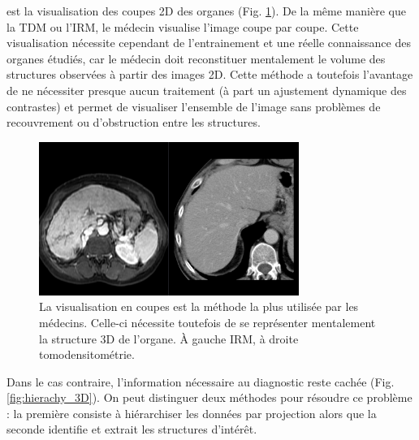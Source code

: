      est la visualisation des coupes 2D des organes (Fig. \ref{fig:slice_visualization}). De la même manière que la TDM ou l'IRM, le médecin visualise l'image coupe par coupe. Cette visualisation nécessite cependant de l'entrainement et une réelle connaissance des organes étudiés, car le médecin doit reconstituer mentalement le volume des structures observées à partir des images 2D. Cette méthode a toutefois l'avantage de ne nécessiter presque aucun traitement (à part un ajustement dynamique des contrastes) et permet de visualiser l'ensemble de l'image sans problèmes de recouvrement ou d'obstruction entre les structures. 
    \begin{figure}[!ht]
      \centering
      \includegraphics[height=5cm]{Images/2D_view.png}
      \caption{La visualisation en coupes est la méthode la plus utilisée par les médecins. Celle-ci nécessite toutefois de se représenter mentalement la structure 3D de l'organe. À gauche IRM, à droite tomodensitométrie.}
      \label{fig:slice_visualization}
    \end{figure}
     Dans le cas contraire, l'information nécessaire au diagnostic reste cachée (Fig. \ref{fig:hierachy_3D}). On peut distinguer deux méthodes pour résoudre ce problème : la première consiste à hiérarchiser les données par projection alors que la seconde identifie et extrait les structures d'intérêt.
